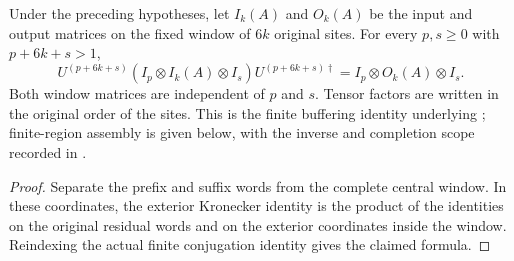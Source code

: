 \begin{lemma}
    \label{thm:mpu_finite_heisenberg_fixed_window}
    \leanok
    Under the preceding hypotheses, let $I_k(A)$ and $O_k(A)$ be the
    input and output matrices on the fixed window of $6k$ original
    sites. For every $p,s\ge0$ with $p+6k+s>1$,
    \[
        U^{(p+6k+s)}
        (I_p\otimes I_k(A)\otimes I_s)
        U^{(p+6k+s)\dagger}
        = I_p\otimes O_k(A)\otimes I_s .
    \]
    Both window matrices are independent of $p$ and $s$. Tensor factors
    are written in the original order of the sites. This is the finite
    buffering identity underlying
    \cite[lines~2300--2306]{Cirac2017MPU}; finite-region assembly is
    given below, with the inverse and completion scope recorded in
    \cite{gap:mpu_qca_complete_block_heisenberg_scope}.
\end{lemma}
\begin{proof}\leanok
    Separate the prefix and suffix words from the complete central
    window. In these coordinates, the exterior Kronecker identity is
    the product of the identities on the original residual words and
    on the exterior coordinates inside the window. Reindexing the
    actual finite conjugation identity gives the claimed formula.
\end{proof}


